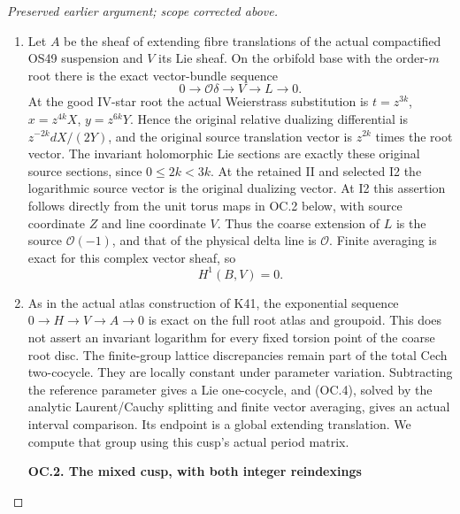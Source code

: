 \begin{proof}[Preserved earlier argument; scope corrected above]
\begin{enumerate}[label=\arabic*.]
\item Let \(A\) be the sheaf of extending fibre translations of the
actual compactified OS49 suspension and \(V\) its Lie sheaf.
On the orbifold base with the order-\(m\) root there is the exact
vector-bundle sequence
\[
 0\longrightarrow\mathcal O\delta\longrightarrow V
          \longrightarrow L\longrightarrow0.             \tag{OC.3}
\]
At the good IV-star root the actual Weierstrass substitution is
\(t=z^{3k}\), \(x=z^{4k}X\), \(y=z^{6k}Y\). Hence the
original relative dualizing differential is
\(z^{-2k}dX/(2Y)\), and the original source translation vector
is \(z^{2k}\) times the root vector. The invariant holomorphic
Lie sections are exactly these original source sections, since
\(0\le2k<3k\). At the retained II and selected I2 the
logarithmic source vector is the original dualizing vector. At I2
this assertion follows directly from the unit torus maps in OC.2
below, with source coordinate \(Z\) and line coordinate \(V\).
Thus the coarse extension of \(L\) is the source
\(\mathcal O(-1)\), and that of the physical delta line is
\(\mathcal O\). Finite averaging is exact for this complex
vector sheaf, so
\[
                         H^1(B,V)=0.                      \tag{OC.4}
\]

\item As in the actual atlas construction of K41, the exponential sequence
\(0\to H\to V\to A\to0\) is exact on the full root
atlas and groupoid. This does not assert an invariant logarithm for
every fixed torsion point of the coarse root disc. The finite-group
lattice discrepancies remain part of the total Cech two-cocycle.
They are locally constant under parameter variation. Subtracting the
reference parameter gives a Lie one-cocycle, and (OC.4), solved by
the analytic Laurent/Cauchy splitting and finite vector averaging,
gives an actual interval comparison. Its endpoint is a global
extending translation. We compute that group using this cusp's
actual period matrix.

\par

\medskip\noindent\textbf{OC.2. The mixed cusp, with both integer reindexings}

\par\nobreak


\end{enumerate}
\end{proof}
